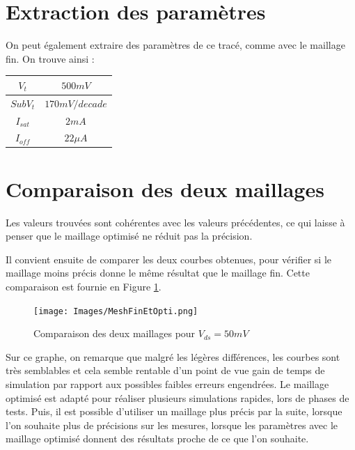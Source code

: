 \documentclass[a4paper,11pt]{report}
\begin{document}
\section{Extraction des paramètres}

On peut également extraire des paramètres de ce tracé, comme avec le maillage fin. On trouve ainsi :

\begin{tableau}[H]
\centering
\begin{tabular}{|c|c|}
\hline
$V_t$&$500mV$\\
\hline
$SubV_t$&$170mV/decade$\\
\hline
$I_{sat}$&$2mA$\\
\hline
$I_{off}$&$22\mu A$\\
\hline
\end{tabular}
\caption{Caractéristiques avec un maillage optimisé avec $V_{ds}=50mV$}
\end{tableau}

\section{Comparaison des deux maillages}

Les valeurs trouvées sont cohérentes avec les valeurs précédentes, ce qui laisse à penser que le maillage optimisé ne réduit pas la précision.

Il convient ensuite de comparer les deux courbes obtenues, pour vérifier si le maillage moins précis donne le même résultat que le maillage fin. Cette comparaison est fournie en Figure \ref{compMesh}.

\begin{figure}[H]
  \centering
  \texttt{[image: Images/MeshFinEtOpti.png]}
  \caption{Comparaison des deux maillages pour $V_{ds}=50mV$}
  \label{compMesh}
\end{figure}


Sur ce graphe, on remarque que malgré les légères différences, les courbes sont très semblables et cela semble rentable d'un point de vue gain de temps de simulation par rapport aux possibles faibles erreurs engendrées. Le maillage optimisé est adapté pour réaliser plusieurs simulations rapides, lors de phases de tests. Puis, il est possible d'utiliser un maillage plus précis par la suite, lorsque l'on souhaite plus de précisions sur les mesures, lorsque les paramètres avec le maillage optimisé donnent des résultats proche de ce que l'on souhaite.

%
\end{document}
